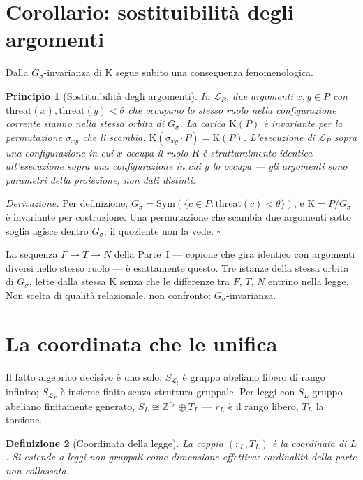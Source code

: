 \documentclass[
    oneside,                 %
    openany,                 %
    titlepage,
    11pt,
    a4paper,
    italian,
    DIV=14,                  %
    headinclude,
    footinclude=true,
    cleardoublepage=empty
]{scrbook}
\theoremstyle{ctplain}
\newtheorem{principio}{Principio}[chapter]
\theoremstyle{ctdef}
\newtheorem{defn}[principio]{Definizione}
\theoremstyle{ctrem}
\newcommand{\Lt}{\mathcal{L}_t}
\newcommand{\LP}{\mathcal{L}_P}
\newcommand{\Kappaa}{\mathrm{K}}
\newcommand{\Sym}{\mathrm{Sym}}
\newcommand{\Gs}{G_{\sigma}}
\begin{document}
\section*{Corollario: sostituibilità degli argomenti}

Dalla $\Gs$-invarianza di $\Kappaa$ segue subito una conseguenza fenomenologica.

\begin{principio}[Sostituibilità degli argomenti]
In $\LP$, due argomenti $x, y \in P$ con $\mathrm{threat}(x), \mathrm{threat}(y) < \theta$ che occupano lo stesso ruolo nella configurazione corrente stanno nella stessa orbita di $\Gs$. La carica $\Kappaa(P)$ è invariante per la permutazione $\sigma_{xy}$ che li scambia: $\Kappaa(\sigma_{xy} \cdot P) = \Kappaa(P)$. L'esecuzione di $\LP$ sopra una configurazione in cui $x$ occupa il ruolo $R$ è strutturalmente identica all'esecuzione sopra una configurazione in cui $y$ lo occupa --- gli argomenti sono parametri della proiezione, non dati distinti.
\end{principio}

\emph{Derivazione.} Per definizione, $\Gs = \Sym(\{c \in P : \mathrm{threat}(c) < \theta\})$, e $\Kappaa = P/\Gs$ è invariante per costruzione. Una permutazione che scambia due argomenti sotto soglia agisce dentro $\Gs$; il quoziente non la vede. $\square$

La sequenza $F \to T \to N$ della Parte~I --- copione che gira identico con argomenti diversi nello stesso ruolo --- è esattamente questo. Tre istanze della stessa orbita di $\Gs$, lette dalla stessa $\Kappaa$ senza che le differenze tra $F$, $T$, $N$ entrino nella legge. Non scelta di qualità relazionale, non confronto: $\Gs$-invarianza.

\section*{La coordinata che le unifica}

Il fatto algebrico decisivo è uno solo: $S_{\Lt}$ è gruppo abeliano libero di rango infinito; $S_{\LP}$ è insieme finito senza struttura gruppale. Per leggi con $S_L$ gruppo abeliano finitamente generato, $S_L \cong \mathbb{Z}^{r_L} \oplus T_L$ --- $r_L$ è il rango libero, $T_L$ la torsione.

\begin{defn}[Coordinata della legge]
La coppia $(r_L, T_L)$ è la coordinata di $L$. Si estende a leggi non-gruppali come dimensione effettiva: cardinalità della parte non collassata.
\end{defn}
\end{document}

